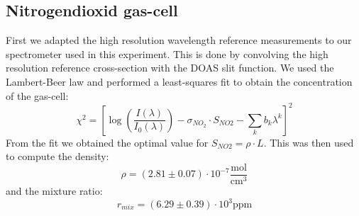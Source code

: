 \documentclass[12pt, english]{scrartcl} %
\begin{document}
\begin{multicols}{2}
\subsection{Nitrogendioxid gas-cell}
First we adapted the high resolution wavelength reference measurements to our spectrometer used in this experiment. This is done by convolving the high resolution reference cross-section with the DOAS slit function. We used the Lambert-Beer law and performed a least-squares fit to obtain the concentration of the gas-cell:
\begin{equation}
\chi^2 = [\log(\frac{I(\lambda)}{I_0(\lambda)})- \sigma_{NO_2} \cdot S_{NO2} - \sum_k b_k \lambda^k ]^2
\end{equation}
From the fit we obtained the optimal value for $S_{NO2}= \rho \cdot L$. This was then used to compute the density:
\begin{equation}
\rho = (2.81 \pm 0.07 ) \cdot 10^{-7} \frac{\text{mol}}{\text{cm}^3}
\end{equation}
and the mixture ratio:
\begin{equation}
r_{mix} = (6.29 \pm 0.39) \cdot 10^3 \text{ppm}
\end{equation}

\end{multicols}
\end{document}

